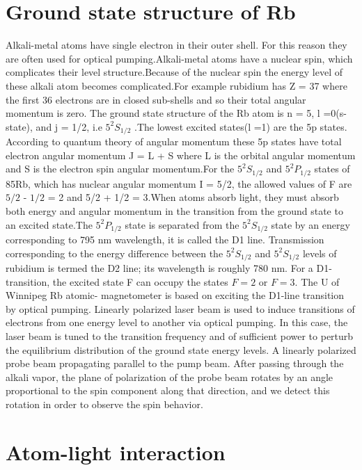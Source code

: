 \documentclass[12pt]{report}
\begin{document}
\section{Ground state structure of Rb }
\label{S:2} 
Alkali-metal atoms have single electron in their outer shell. For this reason they are often used for optical pumping.Alkali-metal atoms have a nuclear spin,
which complicates their level structure.Because of the nuclear spin the energy level of these alkali atom becomes complicated.For example rubidium has Z = 37 where the first 36 electrons are in closed sub-shells and so their total angular momentum is zero. 
The ground state structure of the Rb atom is n = 5, l =0(s-state), and j = 1/2, i.e $5^2S_{1/2}$ .The lowest excited states(l =1) are the
 5p states. According to quantum theory of angular momentum
these 5p states have total electron angular momentum J = L + S where L is
the orbital angular momentum and S is the electron spin angular momentum.For the $5^2S_{1/2}$ and $5^2P_{1/2}$ states of 85Rb, which has nuclear angular momentum I = 5/2, the allowed values of F are $5/2$ - $1/2$ = 2 and 5/2 + 1/2 = 3.When atoms absorb light, they must absorb both energy and angular
momentum in the transition from the ground state to an excited state.The $5^2P_{1/2}$
state is separated from the $5^2S_{1/2}$ state by an energy corresponding to 795 nm wavelength, it is called the
D1 line. Transmission corresponding to the energy difference between the $5^2S_{1/2}$ and $5^2S_{1/2}$ levels of rubidium is termed the D2 line; its wavelength is roughly 780 nm\cite{doe:website}. For a D1-transition, the excited state F can occupy the states $F = 2$ or $F = 3$.
The U of Winnipeg Rb atomic- magnetometer is based on exciting the D1-line transition by optical pumping.  Linearly polarized laser beam is used to induce transitions of electrons from one energy level to another via optical pumping. In this case, the laser beam is tuned to the transition frequency and of sufficient power to perturb the equilibrium distribution of the ground state energy levels\cite{}. A linearly polarized probe beam propagating parallel to the
pump beam. After passing through the alkali vapor, the plane of polarization of the probe beam
rotates by an angle proportional to the spin component along that direction, and we detect
this rotation in order to observe the spin behavior.



\section{Atom-light interaction} 
\end{document}
